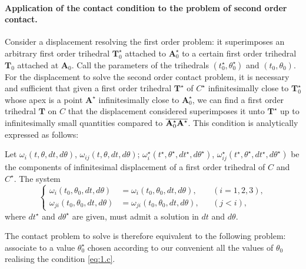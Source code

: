 \documentclass[leqno,11pt]{book}
\numberwithin{equation}{chapter}
\theoremstyle{shape1}
\theoremstyle{shapesmall}
\newcommand{\str}{^{\star}}
\newcommand{\somespace}{\vspace{9pt}}
\begin{document}
\paragraph{Application of the contact condition to the problem of second order contact.}
\label{sec:17}
Consider a displacement resolving the first order problem: it superimposes an arbitrary first order trihedral $\mathbf{T}\str_{0}$ attached to $\mathbf{A}_{0}\str$ to a certain first order trihedral $\mathbf{T}_{0}$ attached at $\mathbf{A}_{0}$. Call the parameters of the trihedrals $(t\str_{0},\theta\str_{0})$ and $(t_{0},\theta_{0})$. For the displacement to solve the second order contact problem, it is necessary and sufficient that given a first order trihedral $\mathbf{T}\str$ of $C\str$ infinitesimally close to $\mathbf{T}\str_{0}$ whose apex is a point $\mathbf{A}\str$ infinitesimally close to $\mathbf{A}\str_{0}$, we can find a first order trihedral $\mathbf{T}$ on $C$ that the displacement considered superimposes it unto $\mathbf{T}\str$ up to infinitesimally small quantities compared to $\overline{\mathbf{A}\str_{0}\mathbf{A}_{\vphantom{0}}^{\star}}$. This condition is analytically expressed as follows:

\somespace

Let $\omega_{i}(t,\theta,dt,d\theta)$, $\omega_{ij}(t,\theta,dt,d\theta)$; $\omega_{i}\str(t\str,\theta\str,dt\str,d\theta\str)$, $\omega_{ij}\str(t\str,\theta\str,dt\str,d\theta\str)$ be the components of infinitesimal displacement  of a first order trihedral of $C$ and $C\str$. The system
\begin{equation}
  \label{eq:1.c}\tag{$c$}
  \left\{
    \begin{aligned}
      \omega_{i}(t_{0},\theta_{0},dt,d\theta)&=\omega_{i}(t_{0},\theta_{0},dt,d\theta),&&(i=1,2,3),\\
      \omega_{ji}(t_{0},\theta_{0},dt,d\theta)&=\omega_{ji}(t_{0},\theta_{0},dt,d\theta),&&(j<i),
    \end{aligned}
  \right.
\end{equation}
where $dt\str$ and $d\theta\str$ are given, must admit a solution in $dt$ and $d\theta$.

\somespace

The contact problem to solve is therefore equivalent to the following problem: associate to a value $\theta_{0}\str$ chosen according to our convenient all the values of $\theta_{0}$ realising the condition \eqref{eq:1.c}.
\end{document}
